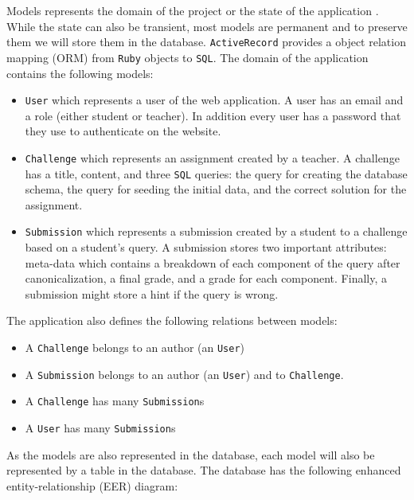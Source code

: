 Models represents the domain of the project \citep{ruby_on_rails} or the state of the application \citep{ruby_on_rails_book}. While the state can also be transient, most models are permanent and to preserve them we will store them in the database. \texttt{ActiveRecord} provides a object relation mapping (ORM) from \texttt{Ruby} objects to \texttt{SQL}. The domain of the application contains the following models:
\begin{itemize}
    \item \texttt{User} which represents a user of the web application. A user has an email and a role (either student or teacher). In addition every user has a password that they use to authenticate on the website.
    \item \texttt{Challenge} which represents an assignment created by a teacher. A challenge has a title, content, and three \texttt{SQL} queries: the query for creating the database schema, the query for seeding the initial data, and the correct solution for the assignment.
    \item \texttt{Submission} which represents a submission created by a student to a challenge based on a student's query. A submission stores two important attributes: meta-data which contains a breakdown of each component of the query after canonicalization, a final grade, and a grade for each component. Finally, a submission might store a hint if the query is wrong.
\end{itemize}

The application also defines the following relations between models:
\begin{itemize}
    \item A \texttt{Challenge} belongs to an author (an \texttt{User})
    \item A \texttt{Submission} belongs to an author (an \texttt{User}) and to \texttt{Challenge}.
    \item A \texttt{Challenge} has many \texttt{Submission}s
    \item A \texttt{User} has many \texttt{Submission}s
\end{itemize}

As the models are also represented in the database, each model will also be represented by a table in the database. The database has the following enhanced entity-relationship (EER) diagram:


